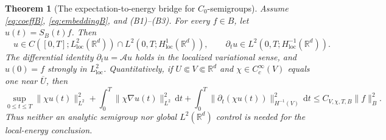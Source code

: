 \documentclass[11pt,a4paper]{article}
\newtheorem{theorem}{Theorem}[section]
\theoremstyle{definition}\newtheorem{definition}{Definition}[section]\newtheorem{example}[theorem]{Example}
\theoremstyle{remark}\newtheorem{remark}[theorem]{Remark}\newtheorem{remarkSix}{Remark}[section]
\newcommand{\Rd}{\mathbb R^d}
\newcommand{\Cc}{C_c^\infty}
\newcommand{\loc}{\mathrm{loc}}
\newcommand{\dd}{\,\mathrm d}
\newcommand{\norm}[1]{\lVert #1\rVert}
\newcommand{\cA}{\mathcal A}
\begin{document}
\begin{theorem}[The expectation-to-energy bridge for $C_0$-semigroups]\label{thm:energyB}
Assume \eqref{eq:coeffB}, \eqref{eq:embeddingB}, and (B1)--(B3). For every $f\in B$, let $u(t)=S_B(t)f$. Then
\begin{equation}\label{eq:energytargetB}
\boxed{\quad u\in C([0,T];L^2_{\loc}(\Rd))\cap L^2(0,T;H^1_{\loc}(\Rd)),
\qquad \partial_tu\in L^2(0,T;H^{-1}_{\loc}(\Rd)).\quad}
\end{equation}
The differential identity $\partial_tu=\cA u$ holds in the localized variational sense, and $u(0)=f$ strongly in $L^2_{\loc}$. Quantitatively, if $U\Subset V\Subset\Rd$ and $\chi\in\Cc(V)$ equals one near $\overline U$, then
\begin{equation}\label{eq:abstractenergyB}
\sup_{0\le t\le T}\norm{\chi u(t)}_{L^2}^2
+\int_0^T\!\norm{\chi\nabla u(t)}_{L^2}^2\dd t
+\int_0^T\!\norm{\partial_t(\chi u(t))}_{H^{-1}(V)}^2\dd t
\le C_{V,\chi,T,B}\norm f_B^2.
\end{equation}
Thus neither an analytic semigroup nor global $L^2(\Rd)$ control is needed for the local-energy conclusion.
\end{theorem}
\end{document}
